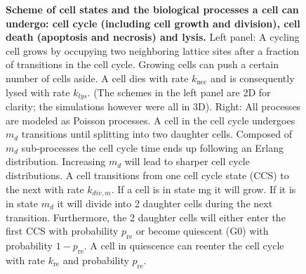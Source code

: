 \documentclass[10pt,letterpaper]{article}
\begin{document}
\begin{figure}[htbp]
\caption{{\bf Scheme of cell states and the biological processes a cell can undergo: cell cycle (including cell growth and division), cell death (apoptosis and necrosis) and lysis.}
 Left panel: A cycling cell grows by occupying two neighboring lattice sites after a fraction of transitions in the cell cycle. Growing cells can push a certain number of cells aside. A cell dies with rate $k_{\text{nec}}$ and is consequently lysed with rate $k_{lys}$. (The schemes in the left panel are 2D for clarity; the simulations however were all in 3D). Right: All processes are modeled as Poisson processes. A cell in the cell cycle undergoes $m_d$ transitions until splitting into two daughter cells. Composed of $m_d$ sub-processes the cell cycle time ends up following an Erlang distribution. Increasing $m_d$ will lead to sharper cell cycle distributions. A cell transitions from one cell cycle state (CCS) to the next with rate $k_{div,m}$. If a cell is in state mg it will grow. If it is in state $m_d$ it will divide into 2 daughter cells during the next transition. Furthermore, the 2 daughter cells will either enter the first CCS with probability $p_{\text{re}}$ or become quiescent (G0) with probability $1 - p_{\text{re}}$. A cell in quiescence can reenter the cell cycle with rate $k_{\text{re}}$ and probability $p_{\text{re}}$.
}
\label{fig:cell-states}
\end{figure}
\end{document}
